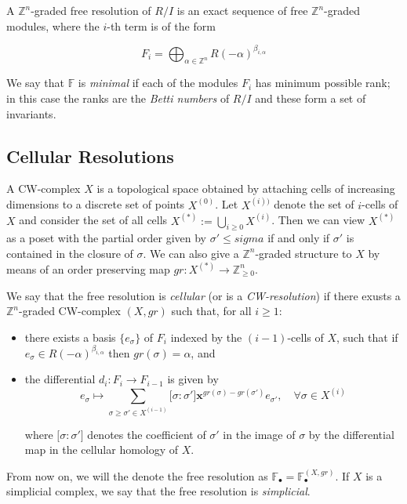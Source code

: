 \documentclass[paper=a4, fontsize=11pt]{scrartcl} %
\theoremstyle{plain}
\theoremstyle{definition}
\begin{document}
A $\mathbb{Z}^n$-graded free resolution of $R/I$ is an exact sequence of free $\mathbb{Z}^n$-graded modules, where the $i$-th term is of the form

$$F_i = \bigoplus_{\alpha \in \mathbb{Z}^n} R(-\alpha)^{\beta_{i,\alpha}}$$

We say that $\mathbb{F}$ is \textit{minimal} if each of the modules $F_i$ has minimum possible rank; in this case the ranks are the \textit{Betti numbers} of $R/I$ and these form a set of invariants.


\subsection{Cellular Resolutions}
A CW-complex $X$ is a topological space obtained by attaching cells of increasing dimensions to a discrete set of points $X^{(0)}$. Let $X^{(i))}$ denote the set of $i$-cells of $X$ and consider the set of all cells $X^{(\ast)} := \bigcup_{i\geq 0} X^{(i)}$. Then we can view $X^{(\ast)}$ as a poset with the partial order given by $\sigma ' \leq sigma$ if and only if $\sigma '$ is contained in the closure of $\sigma$. We can also give a $\mathbb{Z}^n$-graded structure to $X$ by means of an order preserving map $gr: X^{(\ast)} \longrightarrow \mathbb{Z}^{n}_{\geq 0}$.

We say that the free resolution is \textit{cellular} (or is a \textit{CW-resolution}) if there exusts a $\mathbb{Z}^n$-graded CW-complex $(X,gr)$ such that, for all $i \geq 1$:

\begin{itemize}
\item there exists a basis $\lbrace e_{\sigma} \rbrace$ of $F_i$ indexed by the $(i-1)$-cells of $X$, such that if $e_{\sigma} \in R(-\alpha)^{\beta_{i,\alpha}}$ then $gr(\sigma) = \alpha$, and
\item the differential $d_i: F_i \longrightarrow F_{i-1}$ is given by $$e_{\sigma} \mapsto \sum_{\sigma \geq \sigma ' \in X^{(i-1)}} \lbrack \sigma : \sigma' \rbrack \mathbf{x}^{gr(\sigma) - gr(\sigma ')} e_{\sigma '}, \quad \forall \sigma \in X^{(i)}$$

where $\lbrack \sigma : \sigma' \rbrack$ denotes the coefficient of $\sigma '$ in the image of $\sigma$ by the differential map in the cellular homology of $X$.
\end{itemize}

From now on, we will the denote the free resolution as $\mathbb{F}_{\bullet} = \mathbb{F}_{\bullet}^{(X,gr)}$. If $X$ is a simplicial complex, we say that the free resolution is \textit{simplicial}.
\end{document}
